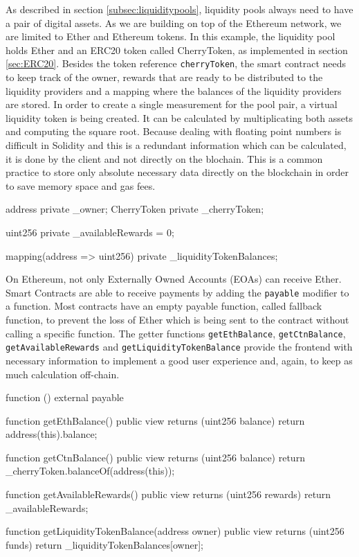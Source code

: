 As described in section \ref{subsec:liquiditypools}, liquidity pools always need to have a pair of digital assets.
As we are building on top of the Ethereum network, we are limited to Ether and Ethereum tokens. In this example, the liquidity pool holds Ether
and an ERC20 token called CherryToken, as implemented in section \ref{sec:ERC20}. Besides the token reference \texttt{cherryToken}, the smart contract
needs to keep track of the owner, rewards that are ready to be distributed to the liquidity providers and a mapping where the balances of the liquidity providers
are stored. In order to create a single measurement for the pool pair, a virtual liquidity token is being created. It can be calculated by multiplicating both assets
and computing the square root. Because dealing with floating point numbers is difficult in Solidity and this is a redundant information which can be calculated, it
is done by the client and not directly on the blochain. This is a common practice to store only absolute necessary data directly on the blockchain in order to save
memory space and gas fees.
\begin{GenericCode}
address private _owner;
CherryToken private _cherryToken;

uint256 private _availableRewards = 0;

mapping(address => uint256) private _liquidityTokenBalances;
\end{GenericCode}

On Ethereum, not only Externally Owned Accounts (EOAs) can receive Ether. Smart Contracts are able to receive payments by adding the \texttt{payable} modifier
to a function. Most contracts have an empty payable function, called fallback function, to prevent the loss of Ether which is being sent to the contract
without calling a specific function. The getter functions \texttt{getEthBalance}, \texttt{getCtnBalance}, \texttt{getAvailableRewards} and
\texttt{getLiquidityTokenBalance} provide the frontend with necessary information to implement a good user experience and, again, to keep as much
calculation off-chain.
\begin{GenericCode}
function () external payable {}

function getEthBalance() public view returns (uint256 balance) {
  return address(this).balance;
}

function getCtnBalance() public view returns (uint256 balance) {
  return _cherryToken.balanceOf(address(this));
}

function getAvailableRewards() public view returns (uint256 rewards) {
  return _availableRewards;
}

function getLiquidityTokenBalance(address owner) public view returns (uint256 funds) {
  return _liquidityTokenBalances[owner];
}
\end{GenericCode}


